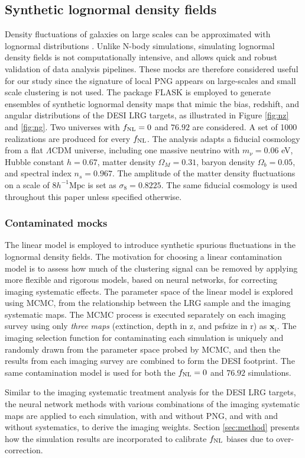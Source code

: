 \subsection{Synthetic lognormal density fields}\label{ssec:mocks}
Density fluctuations of galaxies on large scales can be approximated with lognormal distributions \citep{coles1991}. Unlike N-body simulations, simulating lognormal density fields is not computationally intensive, and allows quick and robust validation of data analysis pipelines. These mocks are therefore considered useful for our study since the signature of local PNG appears on large-scales and small scale clustering is not used. The package \textsc{FLASK} \citep[Full-sky Lognormal Astro-fields Simulation Kit;][]{Xavier_2016} is employed to generate ensembles of synthetic lognormal density maps that mimic the bias, redshift, and angular distributions of the DESI LRG targets, as illustrated in Figure \ref{fig:nz} and \ref{fig:ng}. Two universes with $f_{\rm NL}=0$ and $76.92$ are considered. A set of 1000 realizations are produced for every $f_{\rm NL}$. The analysis adapts a fiducial cosmology from a flat $\Lambda$CDM universe, including one massive neutrino with $m_{\nu}=0.06$ eV, Hubble constant $h = 0.67$, matter density $\Omega_{M}=0.31$, baryon density $\Omega_{b}=0.05$, and spectral index $n_{s}=0.967$. The amplitude of the matter density fluctuations on a scale of $8 h^{-1} \text{Mpc}$ is set as $\sigma_{8}=0.8225$. The same fiducial cosmology is used throughout this paper unless specified otherwise. 

\subsubsection{Contaminated mocks}
The linear model is employed to introduce synthetic spurious fluctuations in the lognormal density fields. The motivation for choosing a linear contamination model is to assess how much of the clustering signal can be removed by applying more flexible and rigorous models, based on neural networks, for correcting imaging systematic effects. The parameter space of the linear model is explored using MCMC, from the relationship between the LRG sample and the imaging systematic maps. The MCMC process is executed separately on each imaging survey using only \textit{three maps} (extinction, depth in z, and psfsize in r) as $\textbf{x}_{i}$. The imaging selection function for contaminating each simulation is uniquely and randomly drawn from the parameter space probed by MCMC, and then the results from each imaging survey are combined to form the DESI footprint. The same contamination model is used for both the $f_{\rm NL}=0$ and $76.92$ simulations.

Similar to the imaging systematic treatment analysis for the DESI LRG targets, the neural network methods with various combinations of the imaging systematic maps are applied to each simulation, with and without PNG, and with and without systematics, to derive the imaging weights. Section \ref{sec:method} presents how the simulation results are incorporated to calibrate $f_{\rm NL}$ biases due to over-correction. 